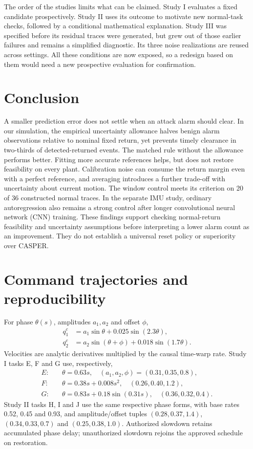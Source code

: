 \documentclass[11pt]{article}
\begin{document}
The order of the studies limits what can be claimed. Study I evaluates a fixed candidate prospectively. Study II uses its outcome to motivate new normal-task checks, followed by a conditional mathematical explanation. Study III was specified before its residual traces were generated, but grew out of those earlier failures and remains a simplified diagnostic. Its three noise realizations are reused across settings. All these conditions are now exposed, so a redesign based on them would need a new prospective evaluation for confirmation.

\section{Conclusion}
A smaller prediction error does not settle when an attack alarm should clear. In our simulation, the empirical uncertainty allowance halves benign alarm observations relative to nominal fixed return, yet prevents timely clearance in two-thirds of detected-returned events. The matched rule without the allowance performs better. Fitting more accurate references helps, but does not restore feasibility on every plant. Calibration noise can consume the return margin even with a perfect reference, and averaging introduces a further trade-off with uncertainty about current motion. The window control meets its criterion on 20 of 36 constructed normal traces. In the separate IMU study, ordinary autoregression also remains a strong control after longer convolutional neural network (CNN) training. These findings support checking normal-return feasibility and uncertainty assumptions before interpreting a lower alarm count as an improvement. They do not establish a universal reset policy or superiority over CASPER.

\appendix
\section{Command trajectories and reproducibility}
For phase $\theta(s)$, amplitudes $a_1,a_2$ and offset $\phi$,
\begin{align}
 q_1^c&=a_1\sin\theta+0.025\sin(2.3\theta),\\
 q_2^c&=a_2\sin(\theta+\phi)+0.018\sin(1.7\theta).
\end{align}
Velocities are analytic derivatives multiplied by the causal time-warp rate. Study I tasks E, F and G use, respectively,
\begin{align*}
 E:&\quad \theta=0.63s,\quad (a_1,a_2,\phi)=(0.31,0.35,0.8),\\
 F:&\quad \theta=0.38s+0.008s^2,\quad (0.26,0.40,1.2),\\
 G:&\quad \theta=0.83s+0.18\sin(0.31s),\quad (0.36,0.32,0.4).
\end{align*}
Study II tasks H, I and J use the same respective phase forms, with base rates 0.52, 0.45 and 0.93, and amplitude/offset tuples $(0.28,0.37,1.4)$, $(0.34,0.33,0.7)$ and $(0.25,0.38,1.0)$. Authorized slowdown retains accumulated phase delay; unauthorized slowdown rejoins the approved schedule on restoration.
\end{document}
